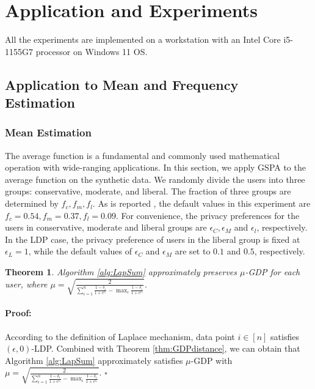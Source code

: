 \documentclass[letterpaper]{article} %
\newtheorem{theorem}{Theorem}
\newenvironment{proof}{\paragraph{Proof:}}{\hfill$\square$}
\begin{document}
\section{Application and Experiments}
All the experiments are implemented on a workstation with an Intel Core i5-1155G7 processor on Windows 11 OS.
\subsection{Application to Mean and Frequency Estimation}

\subsubsection{Mean Estimation}
The average function is a fundamental and commonly used mathematical operation with wide-ranging applications. In this section, we apply GSPA to  the average function on the synthetic data.
We randomly divide the users into three groups: conservative, moderate, and liberal. The fraction of three groups are determined by $f_c, f_m, f_l$.
As is reported \cite{Acquisti2005privacy}, the default values in this experiment are $f_c=0.54, f_m =0.37, f_l=0.09$. For convenience, the privacy preferences for the users in conservative,
moderate and liberal groups are $\epsilon_C, \epsilon_M$ and $\epsilon_l$, respectively. In the LDP case, the privacy preference of users in the liberal group is fixed at $\epsilon_L=1$, while the default values of $\epsilon_C$ and $\epsilon_M$ are set to $0.1$ and $0.5$, respectively.
\begin{theorem}\label{coro:LapsumGDP}
Algorithm \ref{alg:LapSum} approximately preserves $\mu$-GDP for each user, where $
\mu = \sqrt{\frac{2}{\sum_{i=1}^{n} \frac{1-\delta_i}{1+e^{\epsilon_i}}-\max_{i}{\frac{1-\delta_{i}}{1+e^{\epsilon_{i}}}}}}.
$
\end{theorem}
\begin{proof}
According to the definition of Laplace mechanism, data point $i \in [n]$ satisfies $(\epsilon,0)$-LDP. Combined with
Theorem \ref{thm:GDPdistance}, we can obtain that Algorithm \ref{alg:LapSum} approximately satisfies $\mu$-GDP with $
\mu = \sqrt{\frac{2}{\sum_{i=1}^{n} \frac{1-\delta_i}{1+e^{\epsilon_i}}-\max_{i}{\frac{1-\delta_{i}}{1+e^{\epsilon_{i}}}}}}.
$
\end{proof}
\end{document}
